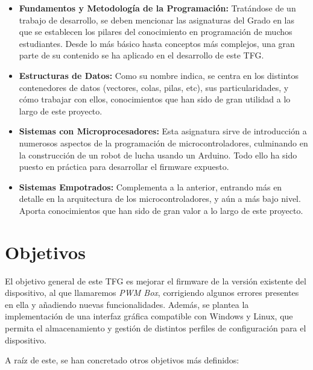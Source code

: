 \begin{itemize}
    \item\textbf{Fundamentos y Metodología de la Programación:} Tratándose de un trabajo de desarrollo, se deben mencionar las asignaturas del Grado en las que se establecen los pilares del conocimiento en programación de muchos estudiantes. Desde lo más básico hasta conceptos más complejos, una gran parte de su contenido se ha aplicado en el desarrollo de este TFG.
    \item\textbf{Estructuras de Datos:} Como su nombre indica, se centra en los distintos contenedores de datos (vectores, colas, pilas, etc), sus particularidades, y cómo trabajar con ellos, conocimientos que han sido de gran utilidad a lo largo de este proyecto.
    \item\textbf{Sistemas con Microprocesadores:} Esta asignatura sirve de introducción a numerosos aspectos de la programación de microcontroladores, culminando en la construcción de un robot de lucha usando un Arduino. Todo ello ha sido puesto en práctica para desarrollar el firmware expuesto.
    \item\textbf{Sistemas Empotrados:} Complementa a la anterior, entrando más en detalle en la arquitectura de los microcontroladores, y aún a más bajo nivel. Aporta conocimientos que han sido de gran valor a lo largo de este proyecto.
\end{itemize}

\section{Objetivos}
\label{sec:objetivos}

El objetivo general de este TFG es mejorar el firmware de la versión existente del dispositivo, al que llamaremos \emph{PWM Box}, corrigiendo algunos errores presentes en ella y añadiendo nuevas funcionalidades. Además, se plantea la implementación de una interfaz gráfica compatible con Windows y Linux, que permita el almacenamiento y gestión de distintos perfiles de configuración para el dispositivo.

A raíz de este, se han concretado otros objetivos más definidos:

